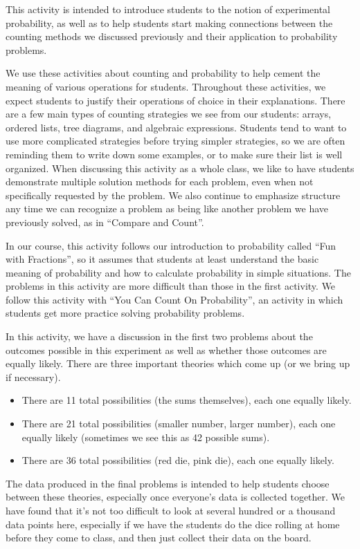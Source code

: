 \documentclass[nooutcomes]{ximera}
\begin{document}
\newpage
\begin{instructorNotes}
This activity is intended to introduce students to the notion of experimental probability, as well as to help students start making connections between the counting methods we discussed previously and their application to probability problems.

We use these activities about counting and probability to help cement the meaning of various operations for students.  Throughout these activities, we expect students to justify their operations of choice in their explanations.  There are a few main types of counting strategies we see from our students: arrays, ordered lists, tree diagrams, and algebraic expressions.  Students tend to want to use more complicated strategies before trying simpler strategies, so we are often reminding them to write down some examples, or to make sure their list is well organized. When discussing this activity as a whole class, we like to have students demonstrate multiple solution methods for each problem, even when not specifically requested by the problem.  We also continue to emphasize structure any time we can recognize a problem as being like another problem we have previously solved, as in ``Compare and Count''.

In our course, this activity follows our introduction to probability called ``Fun with Fractions'', so it assumes that students at least understand the basic meaning of probability and how to calculate probability in simple situations.  The problems in this activity are more difficult than those in the first activity.  We follow this activity with ``You Can Count On Probability'', an activity in which students get more practice solving probability problems.

In this activity, we have a discussion in the first two problems about the outcomes possible in this experiment as well as whether those outcomes are equally likely.  There are three important theories which come up (or we bring up if necessary).
\begin{itemize}
	\item There are 11 total possibilities (the sums themselves), each one equally likely.
	\item There are 21 total possibilities (smaller number, larger number), each one equally likely (sometimes we see this as 42 possible sums).
	\item There are 36 total possibilities (red die, pink die), each one equally likely.
\end{itemize}
The data produced in the final problems is intended to help students choose between these theories, especially once everyone's data is collected together.  We have found that it's not too difficult to look at several hundred or a thousand data points here, especially if we have the students do the dice rolling at home before they come to class, and then just collect their data on the board.


\end{instructorNotes}
\end{document}
